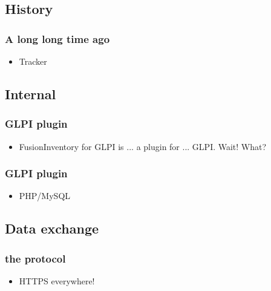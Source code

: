 %
%
\subsection{History}
\begin{frame}
\frametitle{A long long time ago}
%
\begin{itemize}
\item Tracker 
%
\end{itemize}
\end{frame}

\subsection{Internal}
\begin{frame}
\frametitle{GLPI plugin}
%
\begin{itemize}
\item FusionInventory for GLPI is ... a plugin for ... GLPI. Wait! What? 
%
\end{itemize}
\end{frame}

\begin{frame}
\frametitle{GLPI plugin}
%
\begin{itemize}
\item PHP/MySQL
%
\end{itemize}
\end{frame}

\subsection{Data exchange}
\begin{frame}
\frametitle{the protocol}
%
\begin{itemize}
\item HTTPS everywhere! 
%
\end{itemize}
\end{frame}



